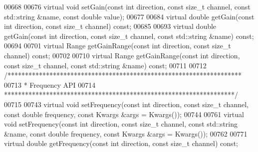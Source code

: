 \begin{DoxyCode}
00668 
00676     \textcolor{keyword}{virtual} \textcolor{keywordtype}{void} setGain(\textcolor{keyword}{const} \textcolor{keywordtype}{int} direction, \textcolor{keyword}{const} \textcolor{keywordtype}{size\_t} channel, \textcolor{keyword}{const} 
      std::string &name, \textcolor{keyword}{const} \textcolor{keywordtype}{double} value);
00677 
00684     \textcolor{keyword}{virtual} \textcolor{keywordtype}{double} getGain(\textcolor{keyword}{const} \textcolor{keywordtype}{int} direction, \textcolor{keyword}{const} \textcolor{keywordtype}{size\_t} channel) \textcolor{keyword}{const};
00685 
00693     \textcolor{keyword}{virtual} \textcolor{keywordtype}{double} getGain(\textcolor{keyword}{const} \textcolor{keywordtype}{int} direction, \textcolor{keyword}{const} \textcolor{keywordtype}{size\_t} channel, \textcolor{keyword}{const} 
      std::string &name) \textcolor{keyword}{const};
00694 
00701     \textcolor{keyword}{virtual} Range getGainRange(\textcolor{keyword}{const} \textcolor{keywordtype}{int} direction, \textcolor{keyword}{const} \textcolor{keywordtype}{size\_t} channel) \textcolor{keyword}{const};
00702 
00710     \textcolor{keyword}{virtual} Range getGainRange(\textcolor{keyword}{const} \textcolor{keywordtype}{int} direction, \textcolor{keyword}{const} \textcolor{keywordtype}{size\_t} channel, \textcolor{keyword}{const} 
      std::string &name) \textcolor{keyword}{const};
00711 
00712     \textcolor{comment}{/*******************************************************************}
00713 \textcolor{comment}{     * Frequency API}
00714 \textcolor{comment}{     ******************************************************************/}
00715 
00743     \textcolor{keyword}{virtual} \textcolor{keywordtype}{void} setFrequency(\textcolor{keyword}{const} \textcolor{keywordtype}{int} direction, \textcolor{keyword}{const} \textcolor{keywordtype}{size\_t} channel, \textcolor{keyword}{const} \textcolor{keywordtype}{double} 
      frequency, \textcolor{keyword}{const} Kwargs &args = Kwargs());
00744 
00761     \textcolor{keyword}{virtual} \textcolor{keywordtype}{void} setFrequency(\textcolor{keyword}{const} \textcolor{keywordtype}{int} direction, \textcolor{keyword}{const} \textcolor{keywordtype}{size\_t} channel, \textcolor{keyword}{const} 
      std::string &name, \textcolor{keyword}{const} \textcolor{keywordtype}{double} frequency, \textcolor{keyword}{const} Kwargs &args = Kwargs());
00762 
00771     \textcolor{keyword}{virtual} \textcolor{keywordtype}{double} getFrequency(\textcolor{keyword}{const} \textcolor{keywordtype}{int} direction, \textcolor{keyword}{const} \textcolor{keywordtype}{size\_t} channel) \textcolor{keyword}{const};

\end{DoxyCode}
